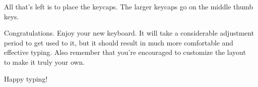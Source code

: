 \documentclass{article}
\begin{document}
\vspace{1em}

All that's left is to place the keycaps. The larger keycaps go on the
middle thumb keys.

\vspace{1em}

Congratulations. Enjoy your new keyboard. It will take a considerable
adjustment period to get used to it, but it should result in much more
comfortable and effective typing. Also remember that you're encouraged
to customize the layout to make it truly your own.

\vspace{1em}

Happy typing!

\end{document}
